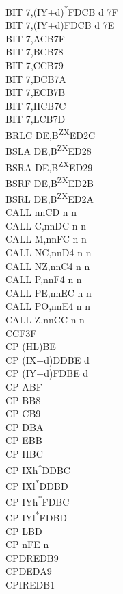 \documentclass[twoside,openright,a4paper]{book}
\begin{document}
\begin{multicols}{3}
{\begin{tabbing}
	BIT 7,(IY+d)\textsuperscript{*}\>FDCB d 7F\\
	BIT 7,(IY+d)\>FDCB d 7E\\
	BIT 7,A\>CB7F\\
	BIT 7,B\>CB78\\
	BIT 7,C\>CB79\\
	BIT 7,D\>CB7A\\
	BIT 7,E\>CB7B\\
	BIT 7,H\>CB7C\\
	BIT 7,L\>CB7D\\
	BRLC DE,B\textsuperscript{ZX}\>ED2C\\
	BSLA DE,B\textsuperscript{ZX}\>ED28\\
	BSRA DE,B\textsuperscript{ZX}\>ED29\\
	BSRF DE,B\textsuperscript{ZX}\>ED2B\\
	BSRL DE,B\textsuperscript{ZX}\>ED2A\\
	CALL nn\>CD n n\\
	CALL C,nn\>DC n n\\
	CALL M,nn\>FC n n\\
	CALL NC,nn\>D4 n n\\
	CALL NZ,nn\>C4 n n\\
	CALL P,nn\>F4 n n\\
	CALL PE,nn\>EC n n\\
	CALL PO,nn\>E4 n n\\
	CALL Z,nn\>CC n n\\
	CCF\>3F\\
	CP (HL)\>BE\\
	CP (IX+d)\>DDBE d\\
	CP (IY+d)\>FDBE d\\
	CP A\>BF\\
	CP B\>B8\\
	CP C\>B9\\
	CP D\>BA\\
	CP E\>BB\\
	CP H\>BC\\
	CP IXh\textsuperscript{*}\>DDBC\\
	CP IXl\textsuperscript{*}\>DDBD\\
	CP IYh\textsuperscript{*}\>FDBC\\
	CP IYl\textsuperscript{*}\>FDBD\\
	CP L\>BD\\
	CP n\>FE n\\
	CPDR\>EDB9\\
	CPD\>EDA9\\
	CPIR\>EDB1\\

\end{tabbing}}
\end{multicols}
\end{document}
